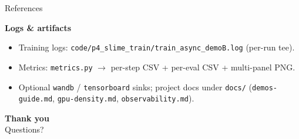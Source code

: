 \documentclass[aspectratio=169]{beamer}
\begin{document}
\begin{frame}[allowframebreaks]{References}
\begin{itemize}
  \end{itemize}
  \textbf{Logs \& artifacts}
  \begin{itemize}\setlength\itemsep{0.1em}
    \item Training logs: \texttt{code/p4\_slime\_train/train\_async\_demoB.log} (per-run tee).
    \item Metrics: \texttt{metrics.py} $\to$ per-step CSV + per-eval CSV + multi-panel PNG.
    \item Optional \texttt{wandb} / \texttt{tensorboard} sinks; project docs under \texttt{docs/}
      (\texttt{demos-guide.md}, \texttt{gpu-density.md}, \texttt{observability.md}).
  \end{itemize}
\end{frame}


\begin{frame}
  \begin{center}
    {\Huge \textbf{Thank you}}\\[1em]
    {\large Questions?}
  \end{center}
\end{frame}
\end{document}
